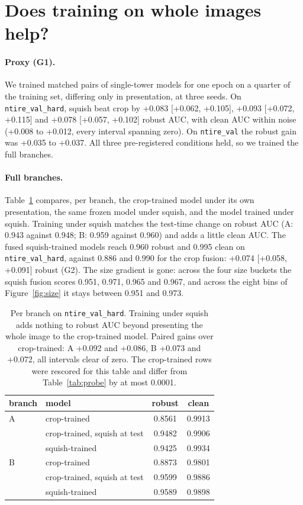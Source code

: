 \documentclass[letterpaper]{article} %
\begin{document}
\section{Does training on whole images help?}
\label{sec:training}

\paragraph{Proxy (G1).} We trained matched pairs of single-tower models for
one epoch on a quarter of the training set, differing only in presentation,
at three seeds. On \texttt{ntire\_val\_hard}, squish beat crop by +0.083
[+0.062, +0.105], +0.093 [+0.072, +0.115] and +0.078 [+0.057, +0.102] robust
AUC, with clean AUC within noise (+0.008 to +0.012, every interval spanning
zero). On \texttt{ntire\_val} the robust gain was +0.035 to +0.037. All three
pre-registered conditions held, so we trained the full branches.

\paragraph{Full branches.} Table~\ref{tab:branches} compares, per branch, the
crop-trained model under its own presentation, the same frozen model under
squish, and the model trained under squish. Training under squish matches the
test-time change on robust AUC (A: 0.943 against 0.948; B: 0.959 against
0.960) and adds a little clean AUC. The fused squish-trained models reach
0.960 robust and 0.995 clean on \texttt{ntire\_val\_hard}, against 0.886 and
0.990 for the crop fusion: +0.074 [+0.058, +0.091] robust (G2). The size
gradient is gone: across the four size buckets the squish fusion scores 0.951,
0.971, 0.965 and 0.967, and across the eight bins of Figure~\ref{fig:size} it
stays between 0.951 and 0.973.

\begin{table}[t]
\centering
\small
\setlength{\tabcolsep}{4pt}
\begin{tabular}{llcc}
\toprule
branch & model & robust & clean \\
\midrule
A & crop-trained & 0.8561 & 0.9913 \\
  & crop-trained, squish at test & 0.9482 & 0.9906 \\
  & squish-trained & 0.9425 & 0.9934 \\
\midrule
B & crop-trained & 0.8873 & 0.9801 \\
  & crop-trained, squish at test & 0.9599 & 0.9886 \\
  & squish-trained & 0.9589 & 0.9898 \\
\bottomrule
\end{tabular}
\caption{Per branch on \texttt{ntire\_val\_hard}. Training under squish adds
nothing to robust AUC beyond presenting the whole image to the crop-trained
model. Paired gains over crop-trained: A +0.092 and +0.086, B +0.073 and
+0.072, all intervals clear of zero. The crop-trained rows were rescored for
this table and differ from Table~\ref{tab:probe} by at most 0.0001.}
\label{tab:branches}
\end{table}
\end{document}
